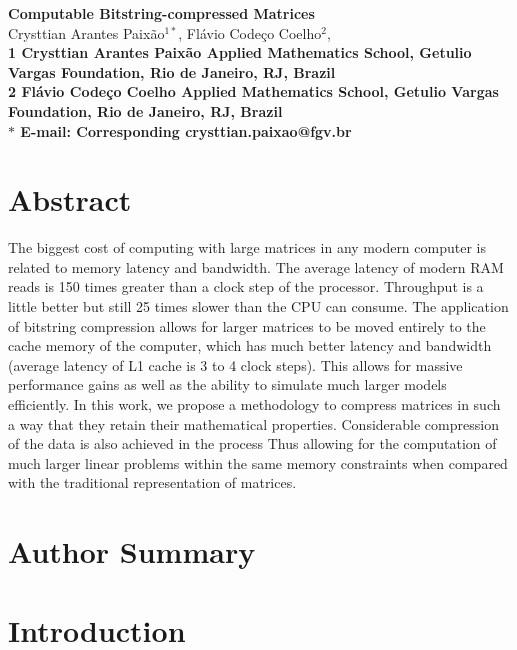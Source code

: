 \documentclass[10pt]{article}
\date{}
\begin{document}
\begin{flushleft}
{\Large
\textbf{Computable Bitstring-compressed Matrices}
}
\\
Crysttian Arantes Paix\~{a}o$^{1\ast}$, 
Fl\'{a}vio Code\c{c}o Coelho$^{2}$, 
\\
\bf{1} Crysttian Arantes Paix\~{a}o Applied Mathematics School, Getulio Vargas Foundation, Rio de Janeiro, RJ, Brazil
\\
\bf{2} Fl\'{a}vio Code\c{c}o Coelho Applied Mathematics School, Getulio Vargas Foundation, Rio de Janeiro, RJ, Brazil
\\
$\ast$ E-mail: Corresponding crysttian.paixao@fgv.br
\end{flushleft}

\section*{Abstract}
The biggest cost of
computing with large matrices in any modern computer is related to memory
latency and bandwidth. The average latency of modern RAM reads is 150 times
greater than a clock step of the processor\cite{alted2010modern}. Throughput is
a little better but still 25 times slower than the CPU can consume. The
application of bitstring compression allows for larger matrices to be moved
entirely to the cache memory of the computer, which has much better latency and
bandwidth (average latency of L1 cache is 3 to 4 clock steps). This allows for
massive performance gains as well as the ability to simulate much larger models
efficiently. In this work, we propose a methodology to compress matrices in such
a way that they retain their mathematical properties. Considerable compression
of the data is also achieved in the process Thus allowing for the computation of
much larger linear problems within the same memory constraints when compared
with the traditional representation of matrices.
\section*{Author Summary}

\section*{Introduction}
\end{document}
